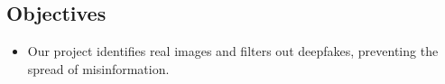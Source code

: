\subsection{Objectives}
\justify
\begin{itemize}
    \item Our project identifies real images and filters out deepfakes, preventing the spread of misinformation.
\end{itemize}
